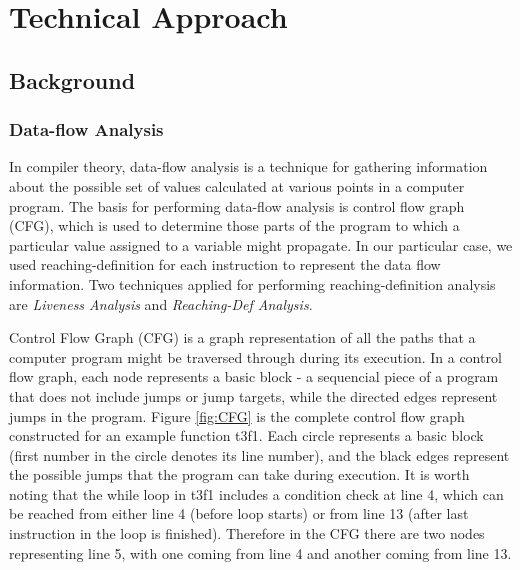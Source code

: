 \chapter{Technical Approach}

\section{Background}
\subsection{Data-flow Analysis}
In compiler theory, data-flow analysis is a technique for gathering information about the possible set of values calculated at various points in a computer program. The basis for performing data-flow analysis is control flow graph (CFG), which is used to determine those parts of the program to which a particular value assigned to a variable might propagate. In our particular case, we used reaching-definition for each instruction to represent the data flow information. Two techniques applied for performing reaching-definition analysis are \textit{Liveness Analysis} and \textit{Reaching-Def Analysis}.

Control Flow Graph (CFG) is a graph representation of all the paths that a computer program might be traversed through during its execution. In a control flow graph, each node represents a basic block - a sequencial piece of a program that does not include jumps or jump targets, while the directed edges represent jumps in the program. Figure \ref{fig:CFG} is the complete control flow graph constructed for an example function t3f1. Each circle represents a basic block (first number in the circle denotes its line number), and the black edges represent the possible jumps that the program can take during execution. It is worth noting that the while loop in t3f1 includes a condition check at line 4, which can be reached from either line 4 (before loop starts) or from line 13 (after last instruction in the loop is finished). Therefore in the CFG there are two nodes representing line 5, with one coming from line 4 and another coming from line 13.


